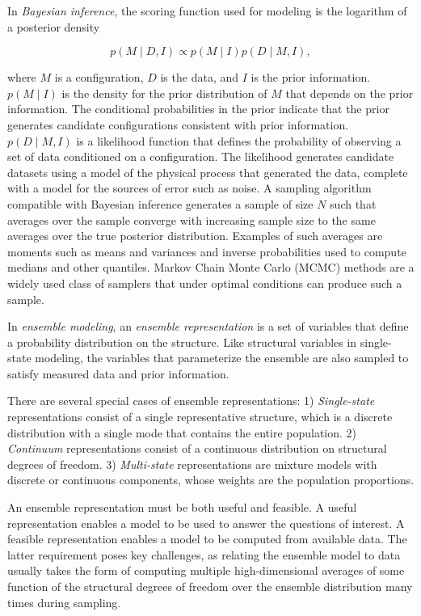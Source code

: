 \documentclass[../main.tex]{subfiles}
\begin{document}
\begin{refsection}
In \emph{Bayesian inference}, the scoring function used for modeling is the logarithm of a posterior density

$$p(M \mid D, I) \propto p(M \mid I) p(D \mid M, I),$$

where $M$ is a configuration, $D$ is the data, and $I$ is the prior information.
$p(M \mid I)$ is the density for the prior distribution of $M$ that depends on the prior information.
The conditional probabilities in the prior indicate that the prior generates candidate configurations consistent with prior information.
$p(D \mid M, I)$ is a likelihood function that defines the probability of observing a set of data conditioned on a configuration.
The likelihood generates candidate datasets using a model of the physical process that generated the data, complete with a model for the sources of error such as noise.
A sampling algorithm compatible with Bayesian inference generates a sample of size $N$ such that averages over the sample converge with increasing sample size to the same averages over the true posterior distribution.
Examples of such averages are moments such as means and variances and inverse probabilities used to compute medians and other quantiles.
Markov Chain Monte Carlo (MCMC) methods are a widely used class of samplers that under optimal conditions can produce such a sample.

In \emph{ensemble modeling}, an \emph{ensemble representation} is a set of variables that define a probability distribution on the structure.
Like structural variables in single-state modeling, the variables that parameterize the ensemble are also sampled to satisfy measured data and prior information.

There are several special cases of ensemble representations: 
1) \emph{Single-state} representations consist of a single representative structure, which is a discrete distribution with a single mode that contains the entire population.
2) \emph{Continuum} representations consist of a continuous distribution on structural degrees of freedom.
3) \emph{Multi-state} representations are mixture models with discrete or continuous components, whose weights are the population proportions.

An ensemble representation must be both useful and feasible.
A useful representation enables a model to be used to answer the questions of interest.
A feasible representation enables a model to be computed from available data.
The latter requirement poses key challenges, as relating the ensemble model to data usually takes the form of computing multiple high-dimensional averages of some function of the structural degrees of freedom over the ensemble distribution many times during sampling.


\end{refsection}
\end{document}
